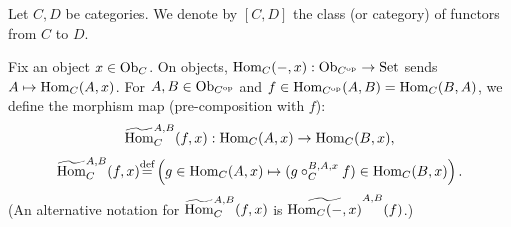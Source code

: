 \documentclass[10pt,a4paper]{article}
\begin{document}
\begin{definition}
Let $C, D$ be categories. We denote by $[C,D]$ the class (or category) of functors from $C$ to $D$.
\end{definition}

\begin{definition}
Fix an object $x \in {\textrm{Ob}}_C$. On objects, ${\textrm{Hom}}_C(-,x) : {\textrm{Ob}}_{C^{\textrm{op}}} \to {\textrm{Set}}$ sends $A \mapsto {\textrm{Hom}}_C(A,x)$.
For $A,B \in {\textrm{Ob}}_{C^{\textrm{op}}}$ and $f \in {\textrm{Hom}}_{C^{\textrm{op}}}(A,B) = {\textrm{Hom}}_C(B,A)$, we define the morphism map (pre-composition with $f$):
$${\widetilde{{\textrm{Hom}}}\textrm{}}^{A,B}_C(f,x) : {\textrm{Hom}}_C(A,x) \to {\textrm{Hom}}_C(B,x),$$
$${\widetilde{{\textrm{Hom}}}\textrm{}}^{A,B}_C(f,x) {\stackrel{{\textrm{def}}}{=}} \left(g \in {\textrm{Hom}}_C(A,x) \mapsto (g \circ_C^{B,A,x} f) \in {\textrm{Hom}}_C(B,x)\right).$$
(An alternative notation for ${\widetilde{{\textrm{Hom}}}\textrm{}}^{A,B}_C(f,x)$ is $\widetilde{{\textrm{Hom}}_C(-,x)}^{A,B}(f)$.)
\end{definition}
\end{document}
